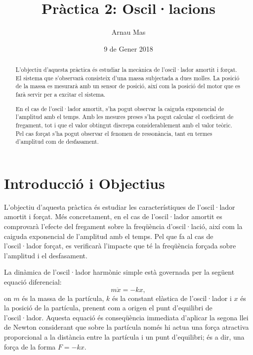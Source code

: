 \documentclass[12pt,a4paper]{article}
\title{\textsf{\textbf{Pràctica 2: Oscil·lacions}}}
\author{Arnau Mas}
\date{9 de Gener 2018}
\begin{document}
\maketitle
{}

\begin{abstract}
	L'objectiu d'aquesta pràctica és estudiar la mecànica de l'oscil·lador amortit i forçat. El sistema que s'observarà consisteix d'una massa subjectada a dues molles. La posició de la massa es mesurarà amb un sensor de posició, així com la posició del motor que es farà servir per a excitar el sistema.

	En el cas de l'oscil·lador amortit, s'ha pogut observar la caiguda exponencial de l'amplitud amb el temps. Amb les mesures preses s'ha pogut calcular el coeficient de fregament, tot i que el valor obtingut discrepa considerablement amb el valor teòric. Pel cas forçat s'ha pogut observar el fenomen de ressonància, tant en termes d'amplitud com de desfasament. 
\end{abstract}

\section{Introducció i Objectius}\label{sec:intro}
L'objectiu d'aquesta pràctica és estudiar les característiques de l'oscil·lador amortit i forçat. Més concretament, en el cas de l'oscil·lador amortit es comprovarà l'efecte del fregament sobre la freqüència d'oscil·lació, així com la caiguda exponencial de l'amplitud amb el temps. Pel que fa al cas de l'oscil·lador forçat, es verificarà l'impacte que té la freqüència forçada sobre l'amplitud i el desfasament.

La dinàmica de l'oscil·lador harmònic simple està governada per la següent equació diferencial:
\begin{equation}
 	m\ddot{x} = -kx, \label{eq:oscilador harmonic simple}
\end{equation}
on \( m \) és la massa de la partícula, \( k \) és la constant elàstica de l'oscil·lador i \( x \) és la posició de la partícula, prenent com a origen el punt d'equilibri de l'oscil·lador. Aquesta equació és conseqüència immediata d'aplicar la segona llei de Newton considerant que sobre la partícula només hi actua una força atractiva proporcional a la distància entre la partícula i un punt d'equilibri; és a dir, una força de la forma \( F = -kx \). 
\end{document}
